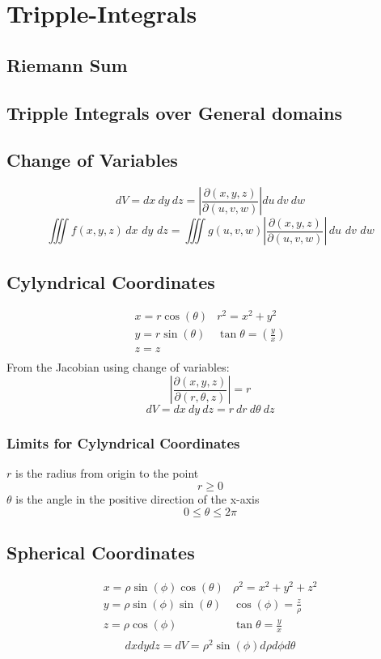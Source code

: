 \section{Tripple-Integrals}
\subsection{Riemann Sum}
\subsection{Tripple Integrals over General domains}
\subsection{Change of Variables}
$$dV=dx\ dy\ dz= \left|\frac{\partial (x,y,z)}{\partial (u,v,w)}\right|du\ dv\ dw$$
$$\iiint f(x,y,z)\,d x\,\,d y\,\,d z=\iiint g(u,v,w)\left|{\frac{\partial(x,y,z)}{\partial(u,v,w)}}\right|\,d u\,\,d v\,\,d w$$
\subsection{Cylyndrical Coordinates}
$$\begin{array}{ll}
  x=r\cos(\theta)&r^2=x^2+y^2\\
  y=r\sin(\theta)&\tan\theta=(\frac{y}{x})\\
  z=z\\
\end{array}$$
From the Jacobian using change of variables:
$$\left|\frac{\partial(x,y,z)}{\partial(r,\theta,z)}\right|=r$$
$$dV=dx\ dy\ dz= r\ dr\ d\theta\ dz$$
\subsubsection{Limits for Cylyndrical Coordinates}
$r$ is the radius from origin to the point
$$r\geq 0$$
$\theta$ is the angle in the positive direction of the x-axis
$$0\leq\theta \leq 2\pi$$

\subsection{Spherical Coordinates}
$$\begin{array}{ll}
  x=\rho \sin(\phi) \cos(\theta)&\rho^2=x^2+y^2+z^2\\       
  y=\rho \sin(\phi) \sin(\theta)&\cos(\phi)=\frac{z}{\rho}\\
  z=\rho \cos(\phi)&             \tan \theta=\frac{y}{x}\\  
\end{array}$$
$$dx dydz=dV=\rho^{2}\sin(\phi)d\rho d\phi d\theta$$
